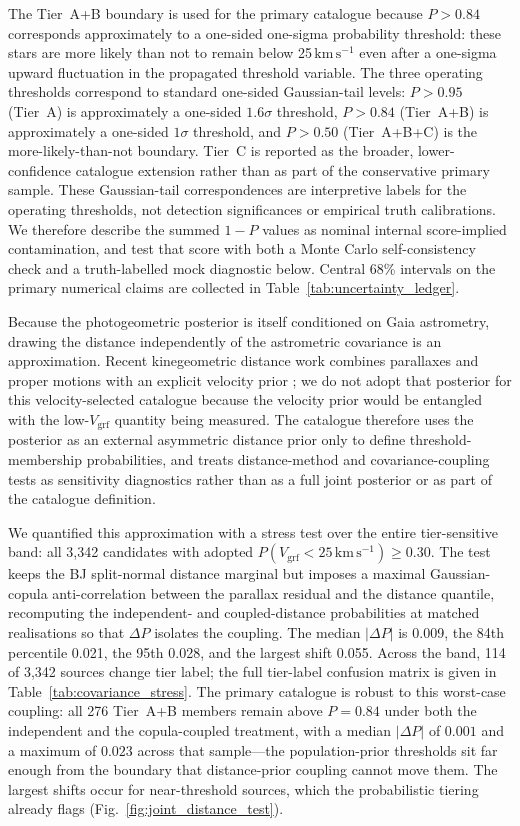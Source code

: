 \documentclass{aa}  %
\newcommand{\vgrf}{\ensuremath{V_{\mathrm{grf}}}\xspace}
\newcommand{\kms}{\ensuremath{\,\mathrm{km\,s^{-1}}}\xspace}
\begin{document}
The Tier~A+B boundary is used for the primary catalogue because $P>0.84$
corresponds approximately to a one-sided one-sigma probability threshold:
these stars are more likely than not to remain below 25\kms{} even after
a one-sigma upward fluctuation in the propagated threshold variable.  The
three operating thresholds correspond to standard one-sided Gaussian-tail
levels: $P>0.95$ (Tier~A) is approximately a one-sided $1.6\sigma$
threshold, $P>0.84$ (Tier~A+B) is approximately a one-sided $1\sigma$
threshold, and $P>0.50$ (Tier~A+B+C) is the more-likely-than-not
boundary.  Tier~C is reported as the broader, lower-confidence catalogue
extension rather than as part of the conservative primary sample.  These
Gaussian-tail correspondences are interpretive labels for the operating
thresholds, not detection significances or empirical truth calibrations.
We therefore describe the summed $1-P$ values as nominal internal
score-implied contamination, and test that score
with both a Monte Carlo self-consistency check and a truth-labelled mock
diagnostic below.  Central 68\% intervals on the
primary numerical claims are collected in
Table~\ref{tab:uncertainty_ledger}.

Because the \citet{BailerJones2021} photogeometric posterior is itself
conditioned on Gaia astrometry, drawing the distance independently of
the astrometric covariance is an approximation.  Recent kinegeometric
distance work combines parallaxes and proper motions with an explicit
velocity prior \citep{BailerJones2023}; we do not adopt that posterior
for this velocity-selected catalogue because the velocity prior would be
entangled with the low-\vgrf{} quantity being measured.  The catalogue
therefore uses the \citet{BailerJones2021} posterior as an external
asymmetric distance prior only to define threshold-membership
probabilities, and treats distance-method and covariance-coupling tests
as sensitivity diagnostics rather than as a full joint posterior or as
part of the catalogue definition.

We quantified this approximation with a stress test over the entire
tier-sensitive band: all 3{,}342 candidates with adopted
$P(\vgrf<25\kms)\geq0.30$.  The test keeps the BJ split-normal distance
marginal but imposes a maximal Gaussian-copula anti-correlation between
the parallax residual and the distance quantile, recomputing the
independent- and coupled-distance probabilities at matched realisations
so that $\Delta P$ isolates the coupling.  The median $|\Delta P|$ is
0.009, the 84th percentile 0.021, the 95th 0.028, and the largest shift
0.055.  Across the band, 114 of 3{,}342 sources change tier label; the
full tier-label confusion matrix is given in
Table~\ref{tab:covariance_stress}.  The primary catalogue is robust to
this worst-case coupling: all 276 Tier~A+B members remain above
$P=0.84$ under both the independent and the copula-coupled treatment,
with a median $|\Delta P|$ of $0.001$ and a maximum of $0.023$ across
that sample---the population-prior thresholds sit far enough from the
boundary that distance-prior coupling cannot move them.  The largest shifts
occur for near-threshold sources, which the probabilistic tiering already
flags (Fig.~\ref{fig:joint_distance_test}).
\end{document}
